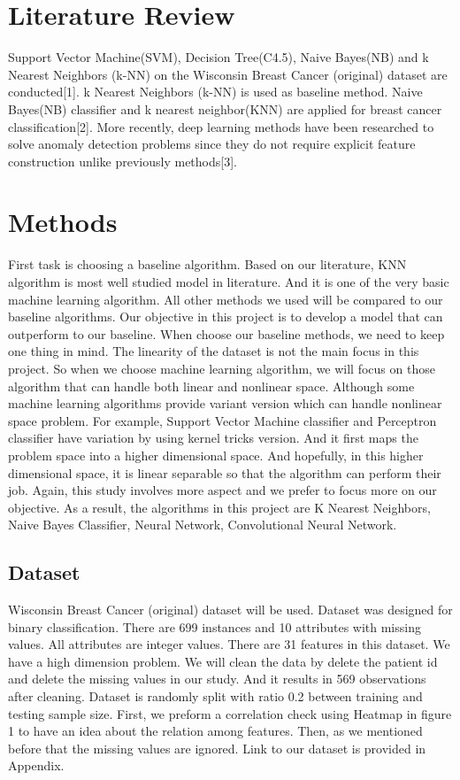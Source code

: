 \documentclass{article} %
\begin{document}
\section{Literature Review}
Support Vector Machine(SVM), Decision Tree(C4.5), Naive Bayes(NB) and k Nearest Neighbors (k-NN) on the Wisconsin Breast Cancer (original) dataset are conducted[1]. k Nearest Neighbors (k-NN) is used as baseline method. Naive Bayes(NB) classifier and k nearest neighbor(KNN) are applied for breast cancer classification[2]. More recently, deep learning methods have been researched to solve anomaly detection problems since they do not require explicit feature construction unlike previously methods[3].

\section{Methods}
First task is choosing a baseline algorithm. Based on our literature, KNN algorithm is most well studied model in literature. And it is one of the very basic machine learning algorithm. All other methods we used will be compared to our baseline algorithms. Our objective in this project is to develop a model that can outperform to our baseline. When choose our baseline methods, we need to keep one thing in mind. The linearity of the dataset is not the main focus in this project. So when we choose machine learning algorithm, we will focus on those algorithm that can handle both linear and nonlinear space. Although some machine learning algorithms provide variant version which can handle nonlinear space problem. For example, Support Vector Machine classifier and Perceptron classifier have variation by using kernel tricks version. And it first maps the problem space into a higher dimensional space. And hopefully, in this higher dimensional space, it is linear separable so that the algorithm can perform their job. Again, this study involves more aspect and we prefer to focus more on our objective. As a result, the algorithms in this project are K Nearest Neighbors, Naive Bayes Classifier, Neural Network, Convolutional Neural Network. 

\subsection{Dataset}
Wisconsin Breast Cancer (original) dataset will be used. Dataset was designed for binary classification. There are 699 instances and 10 attributes with missing values. All attributes are integer values. There are 31 features in this dataset. We have a high dimension problem. We will clean the data by delete the patient id and delete the missing values in our study. And it results in 569 observations after cleaning. Dataset is randomly split with ratio 0.2 between training and testing sample size. First, we preform a correlation check using Heatmap in figure 1 to have an idea about the relation among features. Then, as we mentioned before that the missing values are ignored. Link to our dataset is provided in Appendix. 
\end{document}
